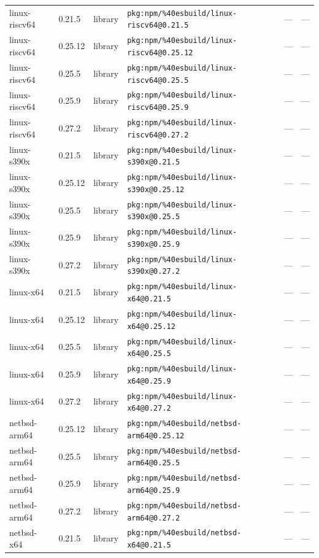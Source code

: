 \documentclass[11pt]{article}
\begin{document}
\begin{longtable}{|l|l|l|p{2.2cm}|l|p{4cm}|}
linux-riscv64 & 0.21.5 & library & \texttt{pkg:npm/\%40esbuild/linux-riscv64@0.21.5} & — & — \\
linux-riscv64 & 0.25.12 & library & \texttt{pkg:npm/\%40esbuild/linux-riscv64@0.25.12} & — & — \\
linux-riscv64 & 0.25.5 & library & \texttt{pkg:npm/\%40esbuild/linux-riscv64@0.25.5} & — & — \\
linux-riscv64 & 0.25.9 & library & \texttt{pkg:npm/\%40esbuild/linux-riscv64@0.25.9} & — & — \\
linux-riscv64 & 0.27.2 & library & \texttt{pkg:npm/\%40esbuild/linux-riscv64@0.27.2} & — & — \\
linux-s390x & 0.21.5 & library & \texttt{pkg:npm/\%40esbuild/linux-s390x@0.21.5} & — & — \\
linux-s390x & 0.25.12 & library & \texttt{pkg:npm/\%40esbuild/linux-s390x@0.25.12} & — & — \\
linux-s390x & 0.25.5 & library & \texttt{pkg:npm/\%40esbuild/linux-s390x@0.25.5} & — & — \\
linux-s390x & 0.25.9 & library & \texttt{pkg:npm/\%40esbuild/linux-s390x@0.25.9} & — & — \\
linux-s390x & 0.27.2 & library & \texttt{pkg:npm/\%40esbuild/linux-s390x@0.27.2} & — & — \\
linux-x64 & 0.21.5 & library & \texttt{pkg:npm/\%40esbuild/linux-x64@0.21.5} & — & — \\
linux-x64 & 0.25.12 & library & \texttt{pkg:npm/\%40esbuild/linux-x64@0.25.12} & — & — \\
linux-x64 & 0.25.5 & library & \texttt{pkg:npm/\%40esbuild/linux-x64@0.25.5} & — & — \\
linux-x64 & 0.25.9 & library & \texttt{pkg:npm/\%40esbuild/linux-x64@0.25.9} & — & — \\
linux-x64 & 0.27.2 & library & \texttt{pkg:npm/\%40esbuild/linux-x64@0.27.2} & — & — \\
netbsd-arm64 & 0.25.12 & library & \texttt{pkg:npm/\%40esbuild/netbsd-arm64@0.25.12} & — & — \\
netbsd-arm64 & 0.25.5 & library & \texttt{pkg:npm/\%40esbuild/netbsd-arm64@0.25.5} & — & — \\
netbsd-arm64 & 0.25.9 & library & \texttt{pkg:npm/\%40esbuild/netbsd-arm64@0.25.9} & — & — \\
netbsd-arm64 & 0.27.2 & library & \texttt{pkg:npm/\%40esbuild/netbsd-arm64@0.27.2} & — & — \\
netbsd-x64 & 0.21.5 & library & \texttt{pkg:npm/\%40esbuild/netbsd-x64@0.21.5} & — & — \\

\end{longtable}
\end{document}
